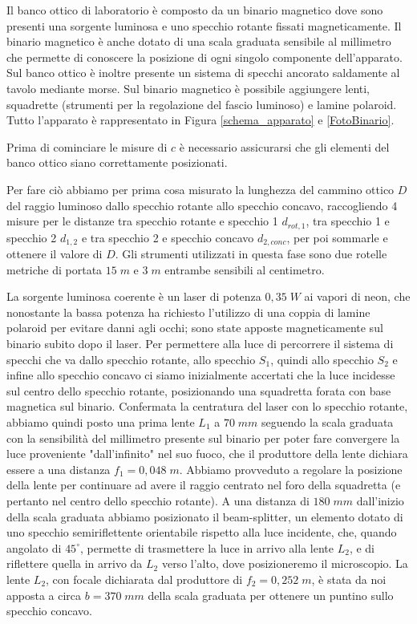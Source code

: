 \documentclass{article}
\begin{document}
Il banco ottico di laboratorio è composto da un binario magnetico dove sono presenti una sorgente luminosa e uno specchio rotante fissati magneticamente. Il binario magnetico
è anche dotato di una scala graduata sensibile al millimetro che permette di conoscere la posizione di ogni singolo componente dell'apparato. Sul banco ottico è inoltre 
presente un sistema di specchi ancorato saldamente al tavolo mediante morse. Sul binario magnetico è possibile aggiungere lenti, squadrette (strumenti per la 
regolazione del fascio luminoso) e lamine polaroid. Tutto l'apparato è rappresentato in Figura \ref{schema_apparato} e \ref{FotoBinario}.

Prima di cominciare le misure di $c$ è necessario assicurarsi che gli elementi del banco ottico siano correttamente posizionati.

\vspace{3mm}

Per fare ciò abbiamo per prima cosa misurato la lunghezza del cammino ottico $D$ del raggio luminoso dallo specchio rotante allo specchio concavo, raccogliendo 
4 misure per le distanze tra specchio rotante e specchio 1 $d_{rot,1}$, tra specchio 1 e specchio 2 $d_{1,2}$ e tra specchio 2 e specchio concavo $d_{2,conc}$, per poi 
sommarle e ottenere il valore di $D$. Gli strumenti utilizzati in questa fase sono due rotelle metriche di portata $15 \; m$ e $3 \; m$ entrambe sensibili al centimetro.

\vspace{3mm}
La sorgente luminosa coerente è un laser di potenza $0,35 \; W$ ai vapori di neon, che nonostante la bassa potenza ha richiesto l'utilizzo di una coppia di lamine polaroid per evitare danni agli
occhi; sono state apposte magneticamente sul binario subito dopo il laser.
Per permettere alla luce di percorrere il sistema di specchi che va dallo specchio rotante, allo specchio $S_1$, quindi allo specchio $S_2$ e infine allo specchio concavo 
ci siamo inizialmente accertati che la luce incidesse sul centro dello specchio rotante, posizionando una squadretta forata con base magnetica sul binario.
Confermata la centratura del laser con lo specchio rotante, abbiamo quindi posto una prima lente $L_1$ a $70 \; mm$ seguendo la scala graduata con la sensibilità del 
millimetro presente sul binario per poter fare convergere la luce proveniente "dall'infinito" nel suo fuoco, che il produttore 
della lente dichiara essere a una distanza $f_1 = 0,048 \; m$. Abbiamo provveduto a regolare la posizione della lente per continuare ad avere il raggio centrato nel foro
della squadretta (e pertanto nel centro dello specchio rotante). A una distanza di $180 \; mm$ dall'inizio della scala graduata abbiamo posizionato il beam-splitter, un elemento dotato di uno
specchio semiriflettente orientabile rispetto alla luce incidente, che, quando angolato di $45^\circ$, permette di trasmettere la luce in arrivo alla lente $L_2$, e di riflettere quella in arrivo da 
$L_2$ verso l'alto, dove posizioneremo il microscopio. La lente $L_2$, con focale dichiarata dal produttore di $f_2=0,252 \; m$, è stata da noi 
apposta a circa $b = 370 \; mm$ della scala graduata per ottenere un puntino sullo specchio concavo. 
\end{document}
